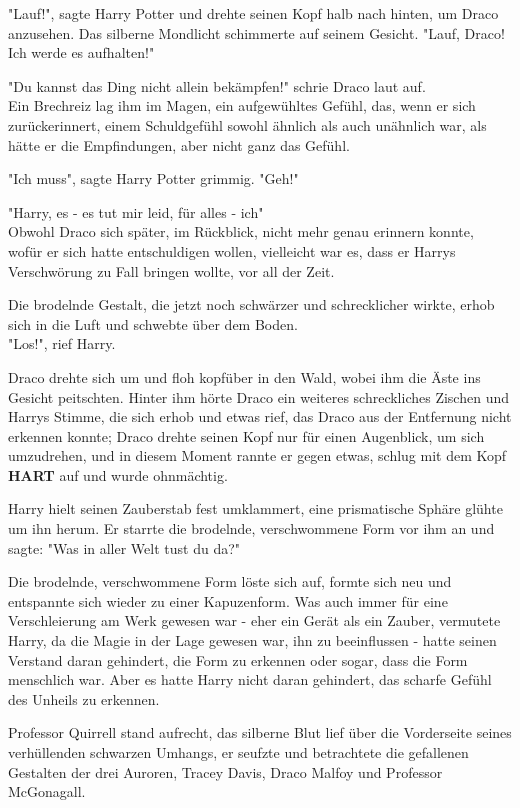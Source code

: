{"Lauf!", sagte Harry Potter und drehte seinen Kopf halb nach hinten, um Draco anzusehen. Das silberne Mondlicht schimmerte auf seinem Gesicht. "Lauf, Draco! Ich werde es aufhalten!"

"Du kannst das Ding nicht allein bekämpfen!" schrie Draco laut auf.\\ Ein Brechreiz lag ihm im Magen, ein aufgewühltes Gefühl, das, wenn er sich zurückerinnert, einem Schuldgefühl sowohl ähnlich als auch unähnlich war, als hätte er die Empfindungen, aber nicht ganz das Gefühl.

"Ich muss", sagte Harry Potter grimmig. "Geh!"

"Harry, es - es tut mir leid, für alles - ich"\\ Obwohl Draco sich später, im Rückblick, nicht mehr genau erinnern konnte, wofür er sich hatte entschuldigen wollen, vielleicht war es, dass er Harrys Verschwörung zu Fall bringen wollte, vor all der Zeit.

Die brodelnde Gestalt, die jetzt noch schwärzer und schrecklicher wirkte, erhob sich in die Luft und schwebte über dem Boden.\\ "Los!", rief Harry.

Draco drehte sich um und floh kopfüber in den Wald, wobei ihm die Äste ins Gesicht peitschten. Hinter ihm hörte Draco ein weiteres schreckliches Zischen und Harrys Stimme, die sich erhob und etwas rief, das Draco aus der Entfernung nicht erkennen konnte; Draco drehte seinen Kopf nur für einen Augenblick, um sich umzudrehen, und in diesem Moment rannte er gegen etwas, schlug mit dem Kopf \textbf{HART} auf und wurde ohnmächtig.

Harry hielt seinen Zauberstab fest umklammert, eine prismatische Sphäre glühte um ihn herum. Er starrte die brodelnde, verschwommene Form vor ihm an und sagte: "Was in aller Welt tust du da?"

Die brodelnde, verschwommene Form löste sich auf, formte sich neu und entspannte sich wieder zu einer Kapuzenform. Was auch immer für eine Verschleierung am Werk gewesen war - eher ein Gerät als ein Zauber, vermutete Harry, da die Magie in der Lage gewesen war, ihn zu beeinflussen - hatte seinen Verstand daran gehindert, die Form zu erkennen oder sogar, dass die Form menschlich war. Aber es hatte Harry nicht daran gehindert, das scharfe Gefühl des Unheils zu erkennen.

Professor Quirrell stand aufrecht, das silberne Blut lief über die Vorderseite seines verhüllenden schwarzen Umhangs, er seufzte und betrachtete die gefallenen Gestalten der drei Auroren, Tracey Davis, Draco Malfoy und Professor McGonagall.

}
